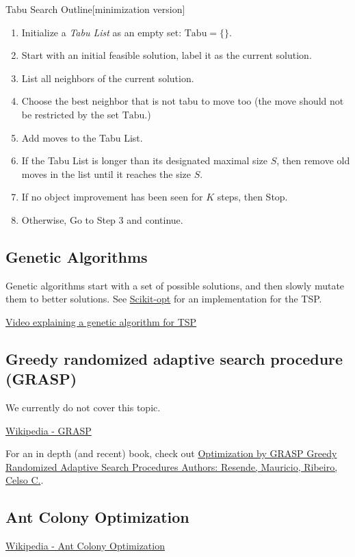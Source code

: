\begin{general}{Tabu Search Outline}{[minimization version]}
\begin{enumerate}
\item Initialize a \emph{Tabu List} as an empty set: $\textrm{Tabu} = \{ \}$.
\item Start with an initial feasible solution, label it as the current solution.
\item List all neighbors of the current solution.
\item Choose the best neighbor that is not tabu to move too (the move should not be restricted by the set $\textrm{Tabu}$.)
\item Add moves to the Tabu List.
\item If the Tabu List is longer than its designated maximal size $S$, then remove old moves in the list until it reaches the size $S$.
\item If no object improvement has been seen for $K$ steps, then Stop.
\item Otherwise, Go to Step 3 and continue.
\end{enumerate}
\end{general}

\subsection{Genetic Algorithms}
Genetic algorithms start with a set of possible solutions, and then slowly mutate them to better solutions.  See \href{https://github.com/guofei9987/scikit-opt}{Scikit-opt} for an implementation for the TSP.

\href{https://www.youtube.com/watch?v=XP8R0yzAbdo&ab_channel=FullstackAcademy}{Video explaining a genetic algorithm for TSP}

\subsection{Greedy randomized adaptive search procedure (GRASP)}
We currently do not cover this topic.  

\href{https://en.wikipedia.org/wiki/Greedy_randomized_adaptive_search_procedure}{Wikipedia - GRASP}

For an in depth (and recent) book, check out
\href{https://www.springer.com/gp/book/9781493965281}{Optimization by GRASP
Greedy Randomized Adaptive Search Procedures
Authors: Resende, Mauricio, Ribeiro, Celso C.}.

\subsection{Ant Colony Optimization}
\href{https://en.wikipedia.org/wiki/Ant_colony_optimization_algorithms}{Wikipedia - Ant Colony Optimization}

